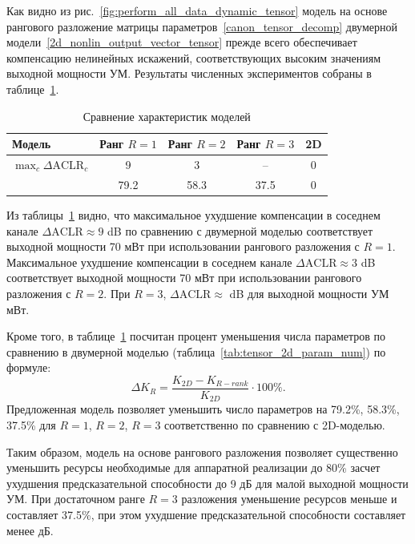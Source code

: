 Как видно из рис.~\ref{fig:perform_all_data_dynamic_tensor} модель на основе рангового разложение матрицы параметров~\eqref{canon_tensor_decomp} двумерной модели~\eqref{2d_nonlin_output_vector_tensor} прежде всего обеспечивает компенсацию нелинейных искажений, соответствующих высоким значениям выходной мощности УМ. Результаты численных экспериментов собраны в таблице~\ref{tab:tensor_vs_2d_results}. 
\begin{table}[h!]
	\centering
	\begin{tabular}{|l|c|c|c|c|}
		\hline
		Модель & Ранг $R=1$ & Ранг $R=2$ & Ранг $R=3$ & 2D \\
		\hline
		$\max_c \Delta \text{ACLR}_c$ & 9 & 3 & -- & 0 \\
		\hline
		\makecell{$\Delta K_R$ (\%)} & 79.2 & 58.3 & 37.5 & 0 \\
		\hline
	\end{tabular}
	\caption{Сравнение характеристик моделей}
	\label{tab:tensor_vs_2d_results}
\end{table}

Из таблицы~\ref{tab:tensor_vs_2d_results} видно, что максимальное ухудшение компенсации в соседнем канале $\Delta\text{ACLR}\approx9$ dB по сравнению с двумерной моделью соответствует выходной мощности 70 мВт при использовании рангового разложения с $R=1$. Максимальное ухудшение компенсации в соседнем канале $\Delta\text{ACLR}\approx3$ dB соответствует выходной мощности 70 мВт при использовании рангового разложения с $R=2$. При $R=3$, $\Delta\text{ACLR}\approx$ dB для выходной мощности УМ мВт. 

Кроме того, в таблице~\ref{tab:tensor_vs_2d_results} посчитан процент уменьшения числа параметров по сравнению в двумерной моделью (таблица~\ref{tab:tensor_2d_param_num}) по формуле:
\begin{equation}
	\Delta K_R=\frac{K_{2D}-K_{R-rank}}{K_{2D}}\cdot100\%.
	\label{tensor_param_num_reduction}
\end{equation}
Предложенная модель позволяет уменьшить число параметров на 79.2\%, 58.3\%, 37.5\% для $R=1$, $R=2$, $R=3$ соответственно по сравнению с 2D-моделью.

Таким образом, модель на основе рангового разложения позволяет существенно уменьшить ресурсы необходимые для аппаратной реализации до 80\% засчет ухудшения предсказательной способности до 9 дБ для малой выходной мощности УМ. При достаточном ранге $R=3$ разложения уменьшение ресурсов меньше и составляет 37.5\%, при этом ухудшение предсказательной способности составляет менее дБ.